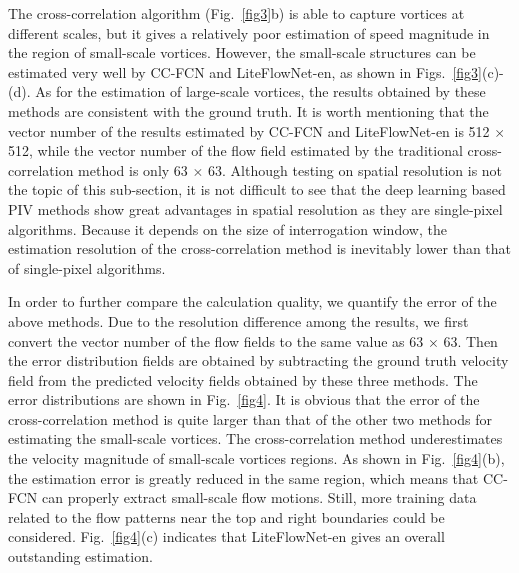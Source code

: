 \documentclass[%
 aip,
 amsmath,amssymb,
 reprint,%
]{revtex4-1}
\begin{document}
The cross-correlation algorithm (Fig.~\ref{fig3}b) is able to capture vortices at different scales, but it gives a relatively poor estimation of speed magnitude in the region of small-scale vortices.
However, the small-scale structures can be estimated very well by CC-FCN and LiteFlowNet-en, as shown in Figs.~\ref{fig3}(c)-(d).
As for the estimation of large-scale vortices, the results obtained by these methods are consistent with the ground truth.
It is worth mentioning that the vector number of the results estimated by CC-FCN and LiteFlowNet-en is 512 $\times$ 512, while the vector number of the flow field estimated by the traditional cross-correlation method is only 63 $\times$ 63.
Although testing on spatial resolution is not the topic of this sub-section, it is not difficult to see that the deep learning based PIV methods show great advantages in spatial resolution as they are single-pixel algorithms. Because it depends on the size of interrogation window, the estimation resolution of the cross-correlation method is inevitably lower than that of single-pixel algorithms.

In order to further compare the calculation quality, we quantify the error of the above methods.
Due to the resolution difference among the results, we first convert the vector number of the flow fields to the same value as 63 $\times$ 63.
Then the error distribution fields are obtained by subtracting the ground truth velocity field from the predicted velocity fields obtained by these three methods. 
The error distributions are shown in Fig.~\ref{fig4}.
It is obvious that the error of the cross-correlation method is quite larger than that of the other two methods for estimating the small-scale vortices. 
The cross-correlation method underestimates the velocity magnitude of small-scale vortices regions.
As shown in Fig.~\ref{fig4}(b), the estimation error is greatly reduced in the same region, which means that CC-FCN can properly extract small-scale flow motions.
Still, more training data related to the flow patterns near the top and right boundaries could be considered.
Fig.~\ref{fig4}(c) indicates that LiteFlowNet-en gives an overall outstanding estimation.
\end{document}
